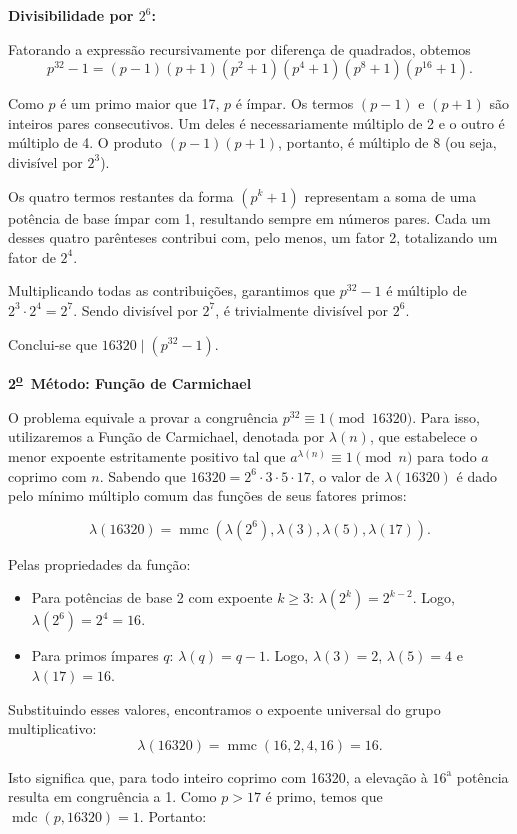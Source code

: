\documentclass{hipatia}
\DeclareMathOperator{\mdc}{mdc}
\DeclareMathOperator{\mmc}{mmc}
\newcommand{\superou}{\textsuperscript{\underline{o}}~}
\begin{document}
\textbf{Divisibilidade por $2^6$:}

Fatorando a expressão recursivamente por diferença de quadrados, obtemos
$$p^{32} - 1 = (p - 1)(p + 1)(p^2 + 1)(p^4 + 1)(p^8 + 1)(p^{16} + 1).$$

Como $p$ é um primo maior que 17, $p$ é ímpar. Os termos $(p - 1)$ e $(p + 1)$ são inteiros pares consecutivos. Um deles é necessariamente múltiplo de 2 e o outro é múltiplo de 4. O produto $(p - 1)(p + 1)$, portanto, é múltiplo de 8 (ou seja, divisível por $2^3$).

Os quatro termos restantes da forma $(p^k + 1)$ representam a soma de uma potência de base ímpar com 1, resultando sempre em números pares. Cada um desses quatro parênteses contribui com, pelo menos, um fator 2, totalizando um fator de $2^4$.

Multiplicando todas as contribuições, garantimos que $p^{32}-1$ é múltiplo de $2^3 \cdot 2^4 = 2^7$. Sendo divisível por $2^7$, é trivialmente divisível por $2^6$.

Conclui-se que $16320 \mid (p^{32}-1)$.

\vspace{0.5cm}
\textbf{2\superou Método: Função de Carmichael}

O problema equivale a provar a congruência $p^{32} \equiv 1 \pmod{16320}$. Para isso, utilizaremos a Função de Carmichael, denotada por $\lambda(n)$, que estabelece o menor expoente estritamente positivo tal que $a^{\lambda(n)} \equiv 1 \pmod n$ para todo $a$ coprimo com $n$. Sabendo que $16320 = 2^6 \cdot 3 \cdot 5 \cdot 17$, o valor de $\lambda(16320)$ é dado pelo mínimo múltiplo comum das funções de seus fatores primos:

$$\lambda(16320) = \mmc(\lambda(2^6), \lambda(3), \lambda(5), \lambda(17)).$$

Pelas propriedades da função:
\begin{itemize}\setlength{\itemsep}{0.5em}
    \item Para potências de base 2 com expoente $k \ge 3$: $\lambda(2^k) = 2^{k-2}$. Logo, $\lambda(2^6) = 2^4 = 16$.
    \item Para primos ímpares $q$: $\lambda(q) = q-1$. Logo, $\lambda(3) = 2$, $\lambda(5) = 4$ e $\lambda(17) = 16$.
\end{itemize}

Substituindo esses valores, encontramos o expoente universal do grupo multiplicativo:
$$\lambda(16320) = \mmc(16, 2, 4, 16) = 16.$$

Isto significa que, para todo inteiro coprimo com 16320, a elevação à $16^{\text{a}}$ potência resulta em congruência a 1. Como $p > 17$ é primo, temos que $\mdc(p, 16320) = 1$. Portanto:
\end{document}
